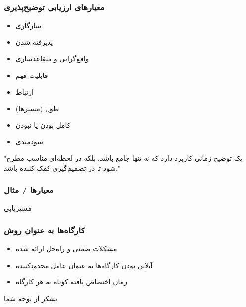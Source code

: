 \documentclass[10pt, a4paper]{beamer}
\begin{document}
\begin{frame}
    \frametitle{معیار‌های ارزیابی توضیح‌پذیری}

    \begin{itemize}
        \item سازگاری
        \item پذیرفته شدن
        \item واقع‌گرایی و متقاعد‌سازی
        \item قابلیت فهم
        \item ارتباط
        \item طول (مسیر‌ها)
        \item کامل بودن یا نبودن
        \item سودمندی
    \end{itemize}

    \centering
    "یک توضیح زمانی کاربرد دارد که نه تنها جامع باشد، بلکه در لحظه‌ای مناسب مطرح
    شود تا در تصمیم‌گیری کمک کننده باشد."
\end{frame}

\begin{frame}
    \frametitle{معیار‌ها / مثال}

    \centering
    مسیریابی
\end{frame}

\begin{frame}
    \frametitle{کارگاه‌ها به عنوان روش }

    \begin{itemize}
        \item مشکلات ضمنی و راه‌حل ارائه شده
        \item آنلاین بودن کارگاه‌ها به عنوان عامل محدود‌کننده
        \item زمان اختصاص یافته کوتاه به هر کارگاه
    \end{itemize}
\end{frame}

\begin{frame}
    \centering
    تشکر از توجه شما
\end{frame}
\end{document}
